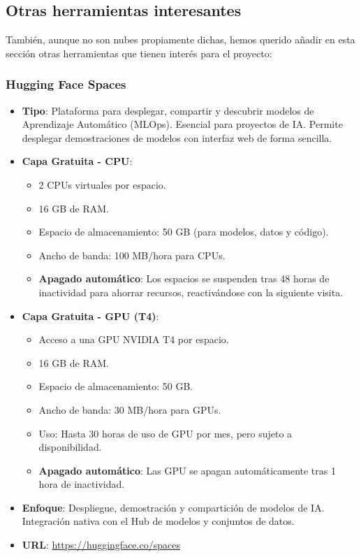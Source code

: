 \subsection{Otras herramientas interesantes}

También, aunque no son nubes propiamente dichas, hemos querido añadir en esta sección otras herramientas que tienen interés para el proyecto:

\subsubsection*{Hugging Face Spaces}
\begin{itemize}
	\item \textbf{Tipo}: Plataforma para desplegar, compartir y descubrir modelos de Aprendizaje Automático (MLOps). Esencial para proyectos de IA. Permite desplegar demostraciones de modelos con interfaz web de forma sencilla.
	\item \textbf{Capa Gratuita - CPU}: 
	\begin{itemize}
		\item 2 CPUs virtuales por espacio.
		\item 16 GB de RAM.
		\item Espacio de almacenamiento: 50 GB (para modelos, datos y código).
		\item Ancho de banda: 100 MB/hora para CPUs.
		\item \textbf{Apagado automático}: Los espacios se suspenden tras 48 horas de inactividad para ahorrar recursos, reactivándose con la siguiente visita.
	\end{itemize}
	\item \textbf{Capa Gratuita - GPU (T4)}: 
	\begin{itemize}
		\item Acceso a una GPU NVIDIA T4 por espacio.
		\item 16 GB de RAM.
		\item Espacio de almacenamiento: 50 GB.
		\item Ancho de banda: 30 MB/hora para GPUs.
		\item Uso: Hasta 30 horas de uso de GPU por mes, pero sujeto a disponibilidad.
		\item \textbf{Apagado automático}: Las GPU se apagan automáticamente tras 1 hora de inactividad.
	\end{itemize}
	\item \textbf{Enfoque}: Despliegue, demostración y compartición de modelos de IA. Integración nativa con el Hub de modelos y conjuntos de datos.
	\item \textbf{URL}: \url{https://huggingface.co/spaces}
\end{itemize}

